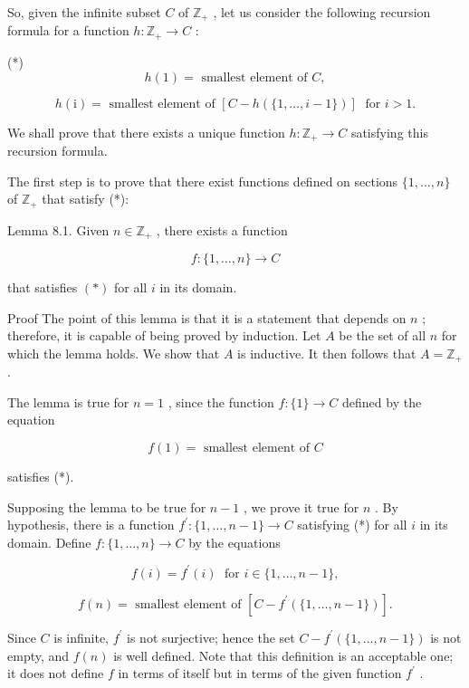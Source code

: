 \documentclass[10pt]{article}
\begin{document}
So, given the infinite subset \(C\) of \({\mathbb{Z}}_{ + }\) , let us consider the following recursion formula for a function \(h : {\mathbb{Z}}_{ + } \rightarrow  C\) :

(*)
\[
h\left( 1\right)  = \text{ smallest element of }C,
\]

\[
h\left( \mathrm{i}\right)  = \text{ smallest element of }\left\lbrack  {C - h\left( {\{ 1,\ldots ,i - 1\} }\right) }\right\rbrack  \;\text{ for }i > 1.
\]

We shall prove that there exists a unique function \(h : {\mathbb{Z}}_{ + } \rightarrow  C\) satisfying this recursion formula.

The first step is to prove that there exist functions defined on sections \(\{ 1,\ldots ,n\}\) of \({\mathbb{Z}}_{ + }\) that satisfy (*):

Lemma 8.1. Given \(n \in  {\mathbb{Z}}_{ + }\) , there exists a function

\[
f : \{ 1,\ldots ,n\}  \rightarrow  C
\]

that satisfies \(\left( *\right)\) for all \(i\) in its domain.

Proof The point of this lemma is that it is a statement that depends on \(n\) ; therefore, it is capable of being proved by induction. Let \(A\) be the set of all \(n\) for which the lemma holds. We show that \(A\) is inductive. It then follows that \(A = {\mathbb{Z}}_{ + }\) .

The lemma is true for \(n = 1\) , since the function \(f : \{ 1\}  \rightarrow  C\) defined by the equation

\[
f\left( 1\right)  = \text{ smallest element of }C
\]

satisfies (*).

Supposing the lemma to be true for \(n - 1\) , we prove it true for \(n\) . By hypothesis, there is a function \({f}^{\prime } : \{ 1,\ldots ,n - 1\}  \rightarrow  C\) satisfying (*) for all \(i\) in its domain. Define \(f : \{ 1,\ldots ,n\}  \rightarrow  C\) by the equations

\[
f\left( i\right)  = {f}^{\prime }\left( i\right) \;\text{ for }i \in  \{ 1,\ldots ,n - 1\} ,
\]

\[
f\left( n\right)  = \text{ smallest element of }\left\lbrack  {C - {f}^{\prime }\left( {\{ 1,\ldots ,n - 1\} }\right) }\right\rbrack  .
\]

Since \(C\) is infinite, \({f}^{\prime }\) is not surjective; hence the set \(C - {f}^{\prime }\left( {\{ 1,\ldots ,n - 1\} }\right)\) is not empty, and \(f\left( n\right)\) is well defined. Note that this definition is an acceptable one; it does not define \(f\) in terms of itself but in terms of the given function \({f}^{\prime }\) .
\end{document}
